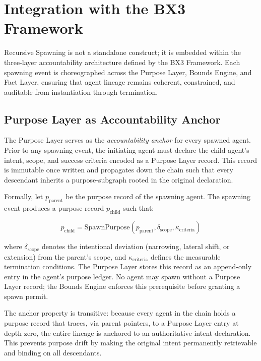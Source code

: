 \section{Integration with the BX3 Framework}
\label{sec:integration}

Recursive Spawning is not a standalone construct; it is embedded within the
three-layer accountability architecture defined by the BX3 Framework. Each
spawning event is choreographed across the Purpose Layer, Bounds Engine,
and Fact Layer, ensuring that agent lineage remains coherent, constrained,
and auditable from instantiation through termination.

\subsection{Purpose Layer as Accountability Anchor}
\label{sec:integration:purpose}

The Purpose Layer serves as the \textit{accountability anchor} for every
spawned agent. Prior to any spawning event, the initiating agent must
declare the child agent's intent, scope, and success criteria encoded
as a Purpose Layer record. This record is immutable once written and
propagates down the chain such that every descendant inherits a
purpose-subgraph rooted in the original declaration.

Formally, let $p_\text{parent}$ be the purpose record of the spawning agent.
The spawning event produces a purpose record $p_\text{child}$ such that:

\begin{equation}
  p_\text{child} = \text{SpawnPurpose}(p_\text{parent}, \delta_\text{scope},
  \kappa_\text{criteria})
\end{equation}

where $\delta_\text{scope}$ denotes the intentional deviation (narrowing,
lateral shift, or extension) from the parent's scope, and
$\kappa_\text{criteria}$ defines the measurable termination conditions.
The Purpose Layer stores this record as an append-only entry in the
agent's purpose ledger. No agent may spawn without a Purpose Layer record;
the Bounds Engine enforces this prerequisite before granting a spawn
permit.

The anchor property is transitive: because every agent in the chain holds
a purpose record that traces, via parent pointers, to a Purpose Layer
entry at depth zero, the entire lineage is anchored to an authoritative
intent declaration. This prevents purpose drift by making the original
intent permanently retrievable and binding on all descendants.

